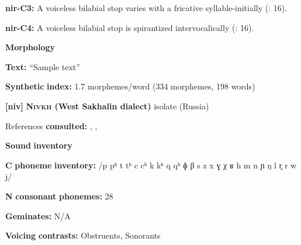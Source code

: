 \begin{styleBody}
\textbf{nir-C3:} A voiceless bilabial stop varies with a fricative syllable-initially (\citealt{MayMay1981}: 16).
\end{styleBody}

\begin{styleBody}
\textbf{nir-C4:} A voiceless bilabial stop is spirantized intervocalically (\citealt{MayMay1981}: 16).
\end{styleBody}

\begin{styleBody}
\textbf{Morphology}
\end{styleBody}

\begin{styleBody}
\textbf{Text:} “Sample text” \citep[172-177]{May1997}
\end{styleBody}

\begin{styleBody}
\textbf{Synthetic} \textbf{index:} 1.7 morphemes/word (334 morphemes, 198 words)
\end{styleBody}

\begin{styleBody}
\textbf{[niv]}   \textbf{\textsc{Nivkh} \textbf{(West} \textbf{Sakhalin} \textbf{dialect)}}  isolate (Russia)
\end{styleBody}

\begin{styleBody}
References \textbf{consulted:} \citet{Gruzdeva1998}, \citet{Kreinovich1979}, \citet{Shiraishi2006}
\end{styleBody}

\begin{styleBody}
\textbf{Sound} \textbf{inventory}
\end{styleBody}

\begin{styleBody}
\textbf{C} \textbf{phoneme} \textbf{inventory:} /p pʰ t tʰ c cʰ k kʰ q qʰ ɸ β s z x ɣ χ ʁ h m n ɲ ŋ l r̥ r w j/
\end{styleBody}

\begin{styleBody}
\textbf{N} \textbf{consonant} \textbf{phonemes:} 28
\end{styleBody}

\begin{styleBody}
\textbf{Geminates:} N/A
\end{styleBody}

\begin{styleBody}
\textbf{Voicing} \textbf{contrasts:} Obstruents, Sonorants
\end{styleBody}

